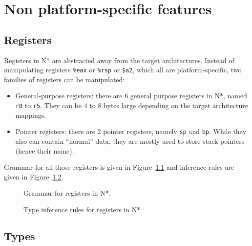 \chapter{Non platform-specific features}\label{chap:nstar-common}

\section{Registers}\label{sec:nstar-common-registers}

Registers in N* are abstracted away from the target architectures.
Instead of manipulating registers \texttt{\%eax} or \texttt{\%rsp} or \texttt{\$a2}, which all are platform-specific, two families of registers can be manipulated:
\begin{itemize}
  \item General-purpose registers: there are 6 general purpose registers in N*, named \texttt{r0} to \texttt{r5}.
        They can be 4 to 8 bytes large depending on the target architecture mappings.
  \item Pointer registers: there are 2 pointer registers, namely \texttt{sp} and \texttt{bp}.
        While they also can contain ``normal'' data, they are mostly used to store stack pointers (hence their name).
\end{itemize}

Grammar for all those registers is given in Figure~\ref{fig:nstar-common-registers-grammar} and inference rules are given in Figure~\ref{fig:nstar-common-registers-typerules}.

\begin{figure}[htb]
  \centering


  \caption{Grammar for registers in N*.}
  \label{fig:nstar-common-registers-grammar}
\end{figure}

\begin{figure}[htb]
  \centering

  \begin{prooftree}
  \end{prooftree}

  \caption{Type inference rules for registers in N*}
  \label{fig:nstar-common-registers-typerules}
\end{figure}

\section{Types}\label{sec:nstar-common-ts}

